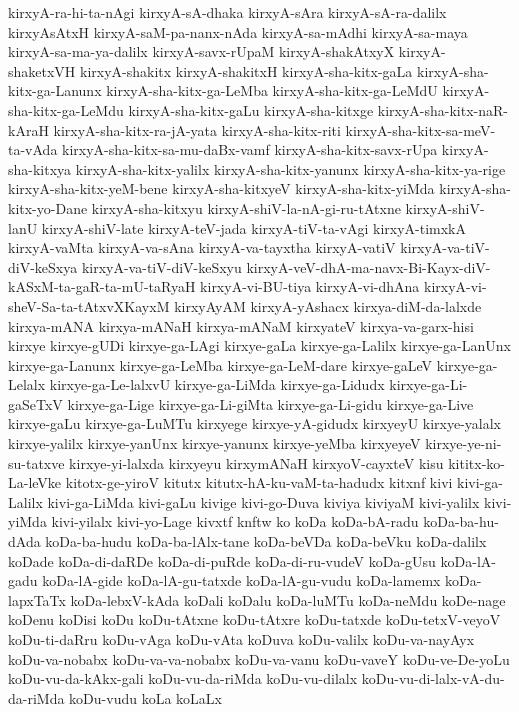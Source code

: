{kirxyA-ra-hi-ta-nAgi
kirxyA-sA-dhaka
kirxyA-sAra
kirxyA-sA-ra-dalilx
kirxyAsAtxH
kirxyA-saM-pa-nanx-nAda
kirxyA-sa-mAdhi
kirxyA-sa-maya
kirxyA-sa-ma-ya-dalilx
kirxyA-savx-rUpaM
kirxyA-shakAtxyX
kirxyA-shaketxVH
kirxyA-shakitx
kirxyA-shakitxH
kirxyA-sha-kitx-gaLa
kirxyA-sha-kitx-ga-Lanunx
kirxyA-sha-kitx-ga-LeMba
kirxyA-sha-kitx-ga-LeMdU
kirxyA-sha-kitx-ga-LeMdu
kirxyA-sha-kitx-gaLu
kirxyA-sha-kitxge
kirxyA-sha-kitx-naR-kAraH
kirxyA-sha-kitx-ra-jA-yata
kirxyA-sha-kitx-riti
kirxyA-sha-kitx-sa-meV-ta-vAda
kirxyA-sha-kitx-sa-mu-daBx-vamf
kirxyA-sha-kitx-savx-rUpa
kirxyA-sha-kitxya
kirxyA-sha-kitx-yalilx
kirxyA-sha-kitx-yanunx
kirxyA-sha-kitx-ya-rige
kirxyA-sha-kitx-yeM-bene
kirxyA-sha-kitxyeV
kirxyA-sha-kitx-yiMda
kirxyA-sha-kitx-yo-Dane
kirxyA-sha-kitxyu
kirxyA-shiV-la-nA-gi-ru-tAtxne
kirxyA-shiV-lanU
kirxyA-shiV-late
kirxyA-teV-jada
kirxyA-tiV-ta-vAgi
kirxyA-timxkA
kirxyA-vaMta
kirxyA-va-sAna
kirxyA-va-tayxtha
kirxyA-vatiV
kirxyA-va-tiV-diV-keSxya
kirxyA-va-tiV-diV-keSxyu
kirxyA-veV-dhA-ma-navx-Bi-Kayx-diV-kASxM-ta-gaR-ta-mU-taRyaH
kirxyA-vi-BU-tiya
kirxyA-vi-dhAna
kirxyA-vi-sheV-Sa-ta-tAtxvXKayxM
kirxyAyAM
kirxyA-yAshacx
kirxya-diM-da-lalxde
kirxya-mANA
kirxya-mANaH
kirxya-mANaM
kirxyateV
kirxya-va-garx-hisi
kirxye
kirxye-gUDi
kirxye-ga-LAgi
kirxye-gaLa
kirxye-ga-Lalilx
kirxye-ga-LanUnx
kirxye-ga-Lanunx
kirxye-ga-LeMba
kirxye-ga-LeM-dare
kirxye-gaLeV
kirxye-ga-Lelalx
kirxye-ga-Le-lalxvU
kirxye-ga-LiMda
kirxye-ga-Lidudx
kirxye-ga-Li-gaSeTxV
kirxye-ga-Lige
kirxye-ga-Li-giMta
kirxye-ga-Li-gidu
kirxye-ga-Live
kirxye-gaLu
kirxye-ga-LuMTu
kirxyege
kirxye-yA-gidudx
kirxyeyU
kirxye-yalalx
kirxye-yalilx
kirxye-yanUnx
kirxye-yanunx
kirxye-yeMba
kirxyeyeV
kirxye-ye-ni-su-tatxve
kirxye-yi-lalxda
kirxyeyu
kirxymANaH
kirxyoV-cayxteV
kisu
kititx-ko-La-leVke
kitotx-ge-yiroV
kitutx
kitutx-hA-ku-vaM-ta-hadudx
kitxnf
kivi
kivi-ga-Lalilx
kivi-ga-LiMda
kivi-gaLu
kivige
kivi-go-Duva
kiviya
kiviyaM
kivi-yalilx
kivi-yiMda
kivi-yilalx
kivi-yo-Lage
kivxtf
knftw
ko
koDa
koDa-bA-radu
koDa-ba-hu-dAda
koDa-ba-hudu
koDa-ba-lAlx-tane
koDa-beVDa
koDa-beVku
koDa-dalilx
koDade
koDa-di-daRDe
koDa-di-puRde
koDa-di-ru-vudeV
koDa-gUsu
koDa-lA-gadu
koDa-lA-gide
koDa-lA-gu-tatxde
koDa-lA-gu-vudu
koDa-lamemx
koDa-lapxTaTx
koDa-lebxV-kAda
koDali
koDalu
koDa-luMTu
koDa-neMdu
koDe-nage
koDenu
koDisi
koDu
koDu-tAtxne
koDu-tAtxre
koDu-tatxde
koDu-tetxV-veyoV
koDu-ti-daRru
koDu-vAga
koDu-vAta
koDuva
koDu-valilx
koDu-va-nayAyx
koDu-va-nobabx
koDu-va-va-nobabx
koDu-va-vanu
koDu-vaveY
koDu-ve-De-yoLu
koDu-vu-da-kAkx-gali
koDu-vu-da-riMda
koDu-vu-dilalx
koDu-vu-di-lalx-vA-du-da-riMda
koDu-vudu
koLa
koLaLx
}
